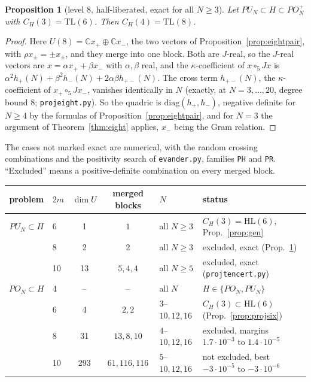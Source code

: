 \documentclass[11pt]{amsart}
\newtheorem{proposition}[theorem]{Proposition}
\theoremstyle{definition}
\theoremstyle{remark}
\theoremstyle{plain}
\numberwithin{equation}{section}
\numberwithin{table}{section}
\newcommand{\C}{\mathbb C}
\newcommand{\TL}{\mathrm{TL}}
\newcommand{\HL}{\mathrm{HL}}
\begin{document}
\begin{proposition}[level $8$, half-liberated, exact for all $N\ge3$]\label{prop:projeight}
Let $PU_N\subset H\subset PO_N^+$ with $C_H(3)=\TL(6)$. Then $C_H(4)=\TL(8)$.
\end{proposition}
\begin{proof}
Here $U(8)=\C x_+\oplus\C x_-$, the two vectors of Proposition~\ref{prop:eightpair}, with $\rho x_\pm=\pm x_\pm$, and they merge into one block. Both are $J$-real, so the $J$-real vectors are $x=\alpha x_++\beta x_-$ with $\alpha,\beta$ real, and the $\kappa$-coefficient of $x\circ_5Jx$ is $\alpha^2h_+(N)+\beta^2h_-(N)+2\alpha\beta h_{+-}(N)$. The cross term $h_{+-}(N)$, the $\kappa$-coefficient of $x_+\circ_5Jx_-$, vanishes identically in $N$ (exactly, at $N=3,\dots,20$, degree bound $8$; \texttt{projeight.py}). So the quadric is $\mathrm{diag}(h_+,h_-)$, negative definite for $N\ge4$ by the formulas of Proposition~\ref{prop:eightpair}, and for $N=3$ the argument of Theorem~\ref{thm:eight} applies, $x_-$ being the Gram relation.
\end{proof}

The cases not marked exact are numerical, with the random crossing combinations and the positivity search of \texttt{evander.py}, families \texttt{PH} and \texttt{PR}. ``Excluded'' means a positive-definite combination on every merged block.

\begin{center}
\begin{tabular}{@{}clccll@{}}
\toprule
problem & $2m$ & $\dim U$ & merged blocks & $N$ & status \\
\midrule
$PU_N\subset H$ & 6 & 1 & $1$ & all $N\ge3$ & $C_H(3)=\HL(6)$, Prop.~\ref{prop:gen} \\
& 8 & 2 & $2$ & all $N\ge3$ & excluded, exact (Prop.~\ref{prop:projeight}) \\
& 10 & 13 & $5,4,4$ & all $N\ge5$ & excluded, exact (\texttt{projtencert.py}) \\
\midrule
$PO_N\subset H$ & 4 & -- & -- & all $N$ & $H\in\{PO_N,PU_N\}$ \\
& 6 & 4 & $2,2$ & $3$--$10,12,16$ & $C_H(3)\subset\HL(6)$ (Prop.~\ref{prop:projsix}) \\
& 8 & 31 & $13,8,10$ & $4$--$10,12,16$ & excluded, margins $1.7\cdot10^{-3}$ to $1.4\cdot10^{-5}$ \\
& 10 & 293 & $61,116,116$ & $5$--$10,12,16$ & not excluded, best $-3\cdot10^{-5}$ to $-3\cdot10^{-6}$ \\
\bottomrule
\end{tabular}
\end{center}
\end{document}
